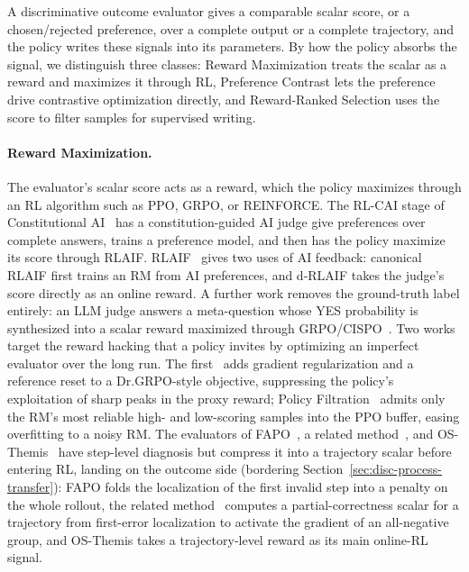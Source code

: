 A discriminative outcome evaluator gives a comparable scalar score, or a chosen/rejected preference, over a complete output or a complete trajectory, and the policy writes these signals into its parameters. By how the policy absorbs the signal, we distinguish three classes: Reward Maximization treats the scalar as a reward and maximizes it through RL, Preference Contrast lets the preference drive contrastive optimization directly, and Reward-Ranked Selection uses the score to filter samples for supervised writing.

\paragraph{Reward Maximization.} The evaluator's scalar score acts as a reward, which the policy maximizes through an RL algorithm such as PPO, GRPO, or REINFORCE. The RL-CAI stage of Constitutional AI~\cite{Bai22b} has a constitution-guided AI judge give preferences over complete answers, trains a preference model, and then has the policy maximize its score through RLAIF. RLAIF~\cite{Lee23b} gives two uses of AI feedback: canonical RLAIF first trains an RM from AI preferences, and d-RLAIF takes the judge's score directly as an online reward. A further work removes the ground-truth label entirely: an LLM judge answers a meta-question whose YES probability is synthesized into a scalar reward maximized through GRPO/CISPO~\cite{Ren26b}. Two works target the reward hacking that a policy invites by optimizing an imperfect evaluator over the long run. The first~\cite{Ack26} adds gradient regularization and a reference reset to a Dr.GRPO-style objective, suppressing the policy's exploitation of sharp peaks in the proxy reward; Policy Filtration~\cite{She24c} admits only the RM's most reliable high- and low-scoring samples into the PPO buffer, easing overfitting to a noisy RM. The evaluators of FAPO~\cite{Din25b}, a related method~\cite{Che25v}, and OS-Themis~\cite{Li26p} have step-level diagnosis but compress it into a trajectory scalar before entering RL, landing on the outcome side (bordering Section~\ref{sec:disc-process-transfer}): FAPO folds the localization of the first invalid step into a penalty on the whole rollout, the related method~\cite{Che25v} computes a partial-correctness scalar for a trajectory from first-error localization to activate the gradient of an all-negative group, and OS-Themis takes a trajectory-level reward as its main online-RL signal.

